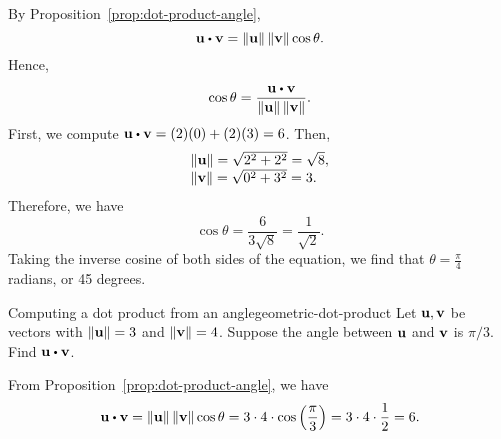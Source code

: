 \begin{solution}
  By Proposition~\ref{prop:dot-product-angle},
  \begin{equation*}
    \vect{u}\dotprod \vect{v}=\norm{\vect{u}} \norm{\vect{v}} \cos \theta.
  \end{equation*}
  Hence,
  \begin{equation*}
    \cos \theta =\frac{\vect{u}\dotprod \vect{v}}{\norm{\vect{u}}\norm{\vect{v}}}.
  \end{equation*}
  First, we compute $\vect{u}\dotprod \vect{v} = (2)(0) + (2)(3) = 6$.
  Then,
  \begin{equation*}
    \begin{array}{l}
      \norm{\vect{u}} = \sqrt{2^2+2^2}=\sqrt{8}, \\
      \norm{\vect{v}} = \sqrt{0^2+3^2}=3.
    \end{array}
  \end{equation*}
  Therefore, we have
  \begin{equation*}
    \cos \theta =\frac{6}{3\sqrt{8}} = \frac{1}{\sqrt{2}}.
  \end{equation*}
  Taking the inverse cosine of both sides of the equation, we find
  that $\theta =\frac{\pi}{4}$ radians, or 45 degrees.
\end{solution}

\begin{example}{Computing a dot product from an angle}{geometric-dot-product}
  Let $\vect{u},\vect{v}$ be vectors with $ \norm{\vect{u}} = 3$ and $\norm{\vect{v}} = 4$.
  Suppose the angle between $\vect{u}$ and $\vect{v}$ is $\pi / 3$. Find $\vect{u}\dotprod \vect{v}$.
\end{example}

\begin{solution}
  From Proposition~\ref{prop:dot-product-angle}, we have
  \begin{equation*}
    \vect{u}\dotprod \vect{v}
    =\norm{\vect{u}} \norm{\vect{v}} \cos \theta
    =3\cdot 4\cdot \cos\paren{\frac{\pi}{3}}
    =3\cdot 4\cdot \frac{1}{2}=6.
\end{equation*}
\end{solution}

